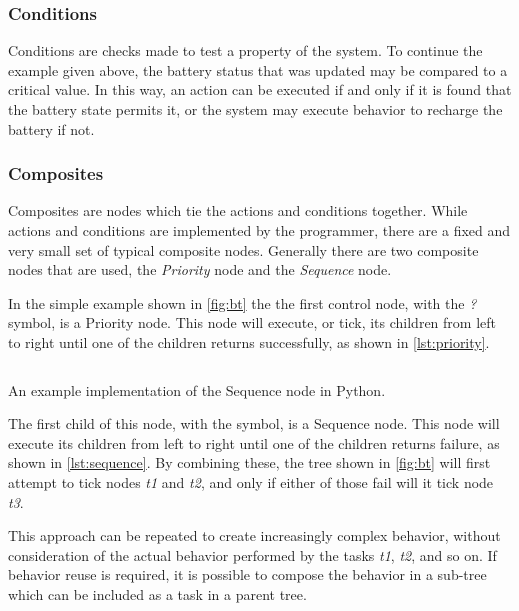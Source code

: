 \documentclass[\rootfolder/main.tex]{subfiles}
\begin{document}
\subsubsection{Conditions}

Conditions are checks made to test a property of the system.
To continue the example given above, the battery status that was updated may be compared to a critical value.
In this way, an action can be executed if and only if it is found that the battery state permits it, or the system may execute behavior to recharge the battery if not.

\subsubsection{Composites}

Composites are nodes which tie the actions and conditions together.
While actions and conditions are implemented by the programmer, there are a fixed and very small set of typical composite nodes.
Generally there are two composite nodes that are used, the \emph{Priority} node and the \emph{Sequence} node.

In the simple example shown in \cref{fig:bt} the the first control node, with the \emph{?} symbol, is a Priority node.
This node will execute, or tick, its children from left to right until one of the children returns successfully, as shown in \cref{lst:priority}.

\begin{listing}
    \inputminted{python}{\rootfolder/Chapters/Chapter2/Listings/sequence.py}
    \caption{An example implementation of the Sequence node in Python.\label{lst:sequence}}
\end{listing}

The first child of this node, with the \emph{\rightarrow} symbol, is a Sequence node.
This node will execute its children from left to right until one of the children returns failure, as shown in \cref{lst:sequence}.
By combining these, the tree shown in \cref{fig:bt} will first attempt to tick nodes \emph{t1} and \emph{t2}, and only if either of those fail will it tick node \emph{t3}.

This approach can be repeated to create increasingly complex behavior, without consideration of the actual behavior performed by the tasks \emph{t1}, \emph{t2}, and so on.
If behavior reuse is required, it is possible to compose the behavior in a sub-tree which can be included as a task in a parent tree.

\end{document}
